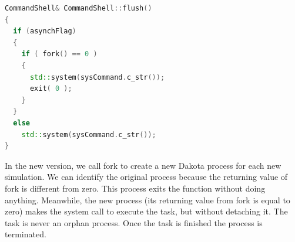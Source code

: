 \documentclass[12pt,a4paper,article]{memoir}
\begin{document}
\begin{lstlisting}[style=MyCodeStyle,language=C++]
CommandShell& CommandShell::flush()
{
  if (asynchFlag)
  {
    if ( fork() == 0 )
    {
      std::system(sysCommand.c_str());
      exit( 0 );
    }
  }
  else
    std::system(sysCommand.c_str());
}
\end{lstlisting}

In the new version, we call fork to create a new Dakota process for each new simulation. We can identify the original process because the returning value of fork is different from zero. This process exits the function without doing anything. Meanwhile, the new process (its returning value from fork is equal to zero) makes the system call to execute the task, but without detaching it. The task is never an orphan process. Once the task is finished the process is terminated.


\end{document}
